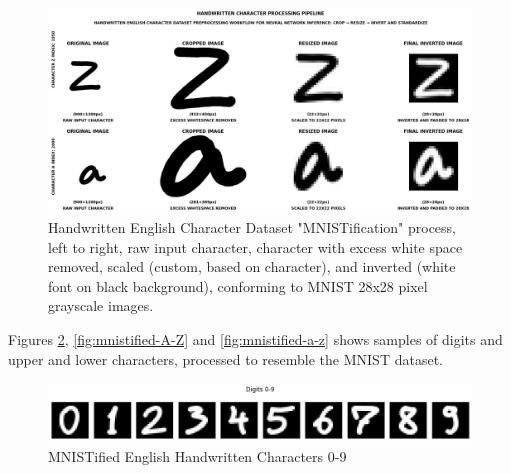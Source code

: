 \begin{figure}[ht]
    \centering
    \includegraphics[width=0.99\columnwidth]{Figures/Results/HandwrittenCharacters/english-handwritten-chracters-dataset-preprocessing.png}
    \caption{Handwritten English Character Dataset "MNISTification" process, left to right, raw input character, character with excess white space removed, scaled (custom, based on character), and inverted (white font on black background), conforming to MNIST 28x28 pixel grayscale images.}
\label{fig:english-handwritten-chracters-dataset-preprocessing}
\end{figure}

Figures \ref{fig:mnistified-0-9}, \ref{fig:mnistified-A-Z} and \ref{fig:mnistified-a-z} shows samples of digits and upper and lower characters, processed to resemble the MNIST dataset.



\begin{figure}[ht]
    \centering
    \includegraphics[width=0.99\columnwidth]{Figures/Results/HandwrittenCharacters/mnistified-0-9.png}
    \caption{MNISTified English Handwritten Characters 0-9}
\label{fig:mnistified-0-9}
\end{figure}


